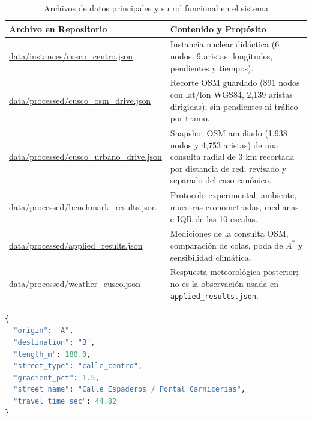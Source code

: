 \begin{table}[H]
    \centering
    \fontsize{9}{11}\selectfont
    \caption{Archivos de datos principales y su rol funcional en el sistema}
    \label{tab:formatos}
    \begin{tabularx}{\textwidth}{@{}>{\ttfamily\raggedright\arraybackslash}p{5.1cm} >{\raggedright\arraybackslash}X@{}}
        \toprule
        \textbf{Archivo en Repositorio} & \textbf{Contenido y Propósito} \\
        \midrule
        \url{data/instances/cusco_centro.json} & Instancia nuclear didáctica (6 nodos, 9 aristas, longitudes, pendientes y tiempos). \\
        \url{data/processed/cusco_osm_drive.json} & Recorte OSM guardado (891 nodos con lat/lon WGS84, 2,139 aristas dirigidas); sin pendientes ni tráfico por tramo. \\
        \url{data/processed/cusco_urbano_drive.json} & Snapshot OSM ampliado (1,938 nodos y 4,753 aristas) de una consulta radial de 3 km recortada por distancia de red; revisado y separado del caso canónico. \\
        \url{data/processed/benchmark_results.json} & Protocolo experimental, ambiente, muestras cronometradas, medianas e IQR de las 10 escalas. \\
        \url{data/processed/applied_results.json} & Mediciones de la consulta OSM, comparación de colas, poda de $A^*$ y sensibilidad climática. \\
        \url{data/processed/weather_cusco.json} & Respuesta meteorológica posterior; no es la observación usada en \texttt{applied\_results.json}. \\
        \bottomrule
    \end{tabularx}
\end{table}

\clearpage

\begin{lstlisting}[language=Python, caption={Extracto del esquema JSON serializado para un segmento vial cusqueño}]
{
  "origin": "A",
  "destination": "B",
  "length_m": 180.0,
  "street_type": "calle_centro",
  "gradient_pct": 1.5,
  "street_name": "Calle Espaderos / Portal Carnicerias",
  "travel_time_sec": 44.82
}
\end{lstlisting}


